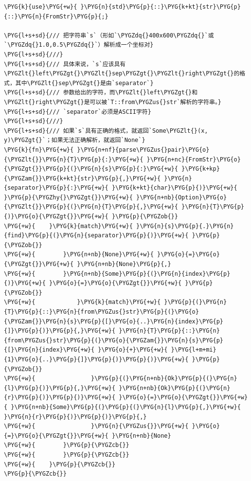 \begin{Verbatim}[commandchars=\\\{\},breaklines=true,breakanywhere=true,fontsize=\codefont,xleftmargin=17bp]
\PYG{k}{use}\PYG{+w}{ }\PYG{n}{std}\PYG{p}{::}\PYG{k+kt}{str}\PYG{p}{::}\PYG{n}{FromStr}\PYG{p}{;}

\PYG{l+s+sd}{/// 把字符串`s`（形如`\PYGZdq{}400x600\PYGZdq{}`或`\PYGZdq{}1.0,0.5\PYGZdq{}`）解析成一个坐标对}
\PYG{l+s+sd}{///}
\PYG{l+s+sd}{/// 具体来说，`s`应该具有\PYGZlt{}left\PYGZgt{}\PYGZlt{}sep\PYGZgt{}\PYGZlt{}right\PYGZgt{}的格式，其中\PYGZlt{}sep\PYGZgt{}是由`separator`}
\PYG{l+s+sd}{/// 参数给出的字符，而\PYGZlt{}left\PYGZgt{}和\PYGZlt{}right\PYGZgt{}是可以被`T::from\PYGZus{}str`解析的字符串。}
\PYG{l+s+sd}{/// `separator`必须是ASCII字符}
\PYG{l+s+sd}{///}
\PYG{l+s+sd}{/// 如果`s`具有正确的格式，就返回`Some\PYGZlt{}(x, y)\PYGZgt{}`；如果无法正确解析，就返回`None`}
\PYG{k}{fn}\PYG{+w}{ }\PYG{n+nf}{parse\PYGZus{}pair}\PYG{o}{\PYGZlt{}}\PYG{n}{T}\PYG{p}{:}\PYG{+w}{ }\PYG{n+nc}{FromStr}\PYG{o}{\PYGZgt{}}\PYG{p}{(}\PYG{n}{s}\PYG{p}{:}\PYG{+w}{ }\PYG{k+kp}{\PYGZam{}}\PYG{k+kt}{str}\PYG{p}{,}\PYG{+w}{ }\PYG{n}{separator}\PYG{p}{:}\PYG{+w}{ }\PYG{k+kt}{char}\PYG{p}{)}\PYG{+w}{ }\PYG{p}{\PYGZhy{}\PYGZgt{}}\PYG{+w}{ }\PYG{n+nb}{Option}\PYG{o}{\PYGZlt{}}\PYG{p}{(}\PYG{n}{T}\PYG{p}{,}\PYG{+w}{ }\PYG{n}{T}\PYG{p}{)}\PYG{o}{\PYGZgt{}}\PYG{+w}{ }\PYG{p}{\PYGZob{}}
\PYG{+w}{    }\PYG{k}{match}\PYG{+w}{ }\PYG{n}{s}\PYG{p}{.}\PYG{n}{find}\PYG{p}{(}\PYG{n}{separator}\PYG{p}{)}\PYG{+w}{ }\PYG{p}{\PYGZob{}}
\PYG{+w}{        }\PYG{n+nb}{None}\PYG{+w}{ }\PYG{o}{=}\PYG{o}{\PYGZgt{}}\PYG{+w}{ }\PYG{n+nb}{None}\PYG{p}{,}
\PYG{+w}{        }\PYG{n+nb}{Some}\PYG{p}{(}\PYG{n}{index}\PYG{p}{)}\PYG{+w}{ }\PYG{o}{=}\PYG{o}{\PYGZgt{}}\PYG{+w}{ }\PYG{p}{\PYGZob{}}
\PYG{+w}{            }\PYG{k}{match}\PYG{+w}{ }\PYG{p}{(}\PYG{n}{T}\PYG{p}{::}\PYG{n}{from\PYGZus{}str}\PYG{p}{(}\PYG{o}{\PYGZam{}}\PYG{n}{s}\PYG{p}{[}\PYG{o}{..}\PYG{n}{index}\PYG{p}{]}\PYG{p}{)}\PYG{p}{,}\PYG{+w}{ }\PYG{n}{T}\PYG{p}{::}\PYG{n}{from\PYGZus{}str}\PYG{p}{(}\PYG{o}{\PYGZam{}}\PYG{n}{s}\PYG{p}{[}\PYG{n}{index}\PYG{+w}{ }\PYG{o}{+}\PYG{+w}{ }\PYG{l+m+mi}{1}\PYG{o}{..}\PYG{p}{]}\PYG{p}{)}\PYG{p}{)}\PYG{+w}{ }\PYG{p}{\PYGZob{}}
\PYG{+w}{                }\PYG{p}{(}\PYG{n+nb}{Ok}\PYG{p}{(}\PYG{n}{l}\PYG{p}{)}\PYG{p}{,}\PYG{+w}{ }\PYG{n+nb}{Ok}\PYG{p}{(}\PYG{n}{r}\PYG{p}{)}\PYG{p}{)}\PYG{+w}{ }\PYG{o}{=}\PYG{o}{\PYGZgt{}}\PYG{+w}{ }\PYG{n+nb}{Some}\PYG{p}{(}\PYG{p}{(}\PYG{n}{l}\PYG{p}{,}\PYG{+w}{ }\PYG{n}{r}\PYG{p}{)}\PYG{p}{)}\PYG{p}{,}
\PYG{+w}{                }\PYG{n}{\PYGZus{}}\PYG{+w}{ }\PYG{o}{=}\PYG{o}{\PYGZgt{}}\PYG{+w}{ }\PYG{n+nb}{None}
\PYG{+w}{        }\PYG{p}{\PYGZcb{}}
\PYG{+w}{        }\PYG{p}{\PYGZcb{}}
\PYG{+w}{    }\PYG{p}{\PYGZcb{}}
\PYG{p}{\PYGZcb{}}


\end{Verbatim}
